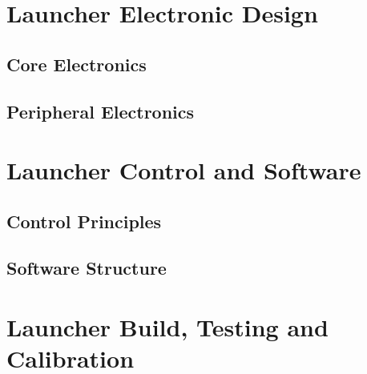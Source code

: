 \clearpage
\section{Launcher Electronic Design}
\label{sec:Launcher Electronic Design}
  \subsection{Core Electronics}
  \label{sub:Core Electronics}
  \subsection{Peripheral Electronics}
  \label{sub:Peripheral Electronics}


\clearpage
\section{Launcher Control and Software}
\label{sec:Launcher Control and Software}
  \subsection{Control Principles}
  \label{sub:Control Principles}
  \subsection{Software Structure}
  \label{sub:Software Structure}


\clearpage
\section{Launcher Build, Testing and Calibration}
\label{sec:Launcher Build, Testing and Calibration}

\clearpage
